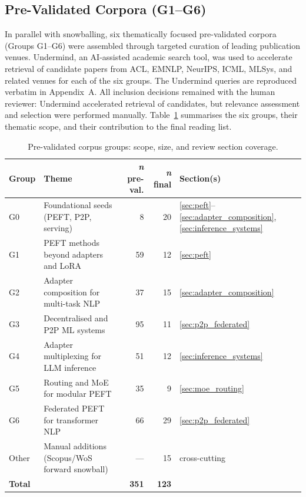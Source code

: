 \subsection{Pre-Validated Corpora (G1--G6)}
\label{sec:methodology:corpora}

In parallel with snowballing, six thematically focused pre-validated corpora (Groups
G1--G6) were assembled through targeted curation of leading publication venues. Undermind,
an AI-assisted academic search tool, was used to accelerate retrieval of candidate papers
from ACL, EMNLP, NeurIPS, ICML, MLSys, and related venues for each of the six groups.
The Undermind queries are reproduced verbatim in Appendix~A. All inclusion decisions
remained with the human reviewer: Undermind accelerated retrieval of candidates, but
relevance assessment and selection were performed manually. Table~\ref{tab:groups} summarises
the six groups, their thematic scope, and their contribution to the final reading list.

\begin{table}[H]
\centering
\caption{Pre-validated corpus groups: scope, size, and review section coverage.}
\label{tab:groups}
\begin{tabular}{lp{5cm}rrl}
\toprule
\textbf{Group} & \textbf{Theme} & \textbf{\textit{n} pre-val.} & \textbf{\textit{n} final} & \textbf{Section(s)} \\
\midrule
G0 & Foundational seeds (PEFT, P2P, serving) & 8   & 20  & \ref{sec:peft}--\ref{sec:adapter_composition}, \ref{sec:inference_systems} \\
G1 & PEFT methods beyond adapters and LoRA   & 59  & 12  & \ref{sec:peft} \\
G2 & Adapter composition for multi-task NLP  & 37  & 15  & \ref{sec:adapter_composition} \\
G3 & Decentralised and P2P ML systems        & 95  & 11  & \ref{sec:p2p_federated} \\
G4 & Adapter multiplexing for LLM inference  & 51  & 12  & \ref{sec:inference_systems} \\
G5 & Routing and MoE for modular PEFT        & 35  & 9   & \ref{sec:moe_routing} \\
G6 & Federated PEFT for transformer NLP      & 66  & 29  & \ref{sec:p2p_federated} \\
Other & Manual additions (Scopus/WoS forward snowball) & --- & 15 & cross-cutting \\
\midrule
\textbf{Total} & & \textbf{351} & \textbf{123} & \\
\bottomrule
\end{tabular}
\end{table}

